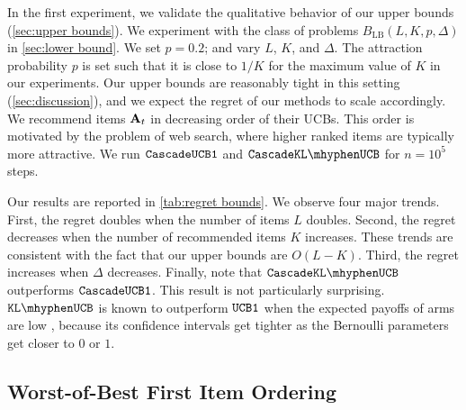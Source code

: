 In the first experiment, we validate the qualitative behavior of our upper bounds (\cref{sec:upper bounds}). We experiment with the class of problems $B_\mathrm{LB}(L, K, p, \Delta)$ in \cref{sec:lower bound}. We set $p = 0.2$; and vary $L$, $K$, and $\Delta$. The attraction probability $p$ is set such that it is close to $1 / K$ for the maximum value of $K$ in our experiments. Our upper bounds are reasonably tight in this setting (\cref{sec:discussion}), and we expect the regret of our methods to scale accordingly. We recommend items $\mathbf{A}_t$ in decreasing order of their UCBs. This order is motivated by the problem of web search, where higher ranked items are typically more attractive. We run ${\tt CascadeUCB1}$ and $\cascadeklucb$ for $n = 10^5$ steps.

Our results are reported in \cref{tab:regret bounds}. We observe four major trends. First, the regret doubles when the number of items $L$ doubles. Second, the regret decreases when the number of recommended items $K$ increases. These trends are consistent with the fact that our upper bounds are $O(L - K)$. Third, the regret increases when $\Delta$ decreases. Finally, note that $\cascadeklucb$ outperforms ${\tt CascadeUCB1}$. This result is not particularly surprising. $\klucb$ is known to outperform ${\tt UCB1}$ when the expected payoffs of arms are low \cite{garivier11klucb}, because its confidence intervals get tighter as the Bernoulli parameters get closer to $0$ or $1$.


\subsection{Worst-of-Best First Item Ordering}
\label{sec:experiments worst-first}

